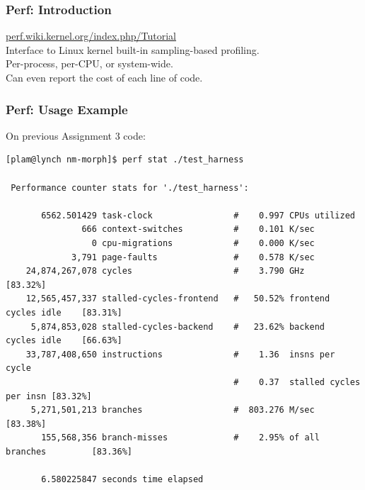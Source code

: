 \begin{frame}
  \frametitle{Perf: Introduction}


\begin{changemargin}{1cm}

    \url{perf.wiki.kernel.org/index.php/Tutorial}\\[1em]

    Interface to Linux kernel built-in sampling-based profiling.\\
    Per-process, per-CPU, or system-wide.\\
    Can even report the cost of each line of code.
    \end{changemargin}
\end{frame}

\begin{frame}[fragile]
  \frametitle{Perf: Usage Example}


\begin{changemargin}{1.5cm}
On previous Assignment 3 code:
\begin{lstlisting}[basicstyle=\tiny]
[plam@lynch nm-morph]$ perf stat ./test_harness

 Performance counter stats for './test_harness':

       6562.501429 task-clock                #    0.997 CPUs utilized          
               666 context-switches          #    0.101 K/sec                  
                 0 cpu-migrations            #    0.000 K/sec                  
             3,791 page-faults               #    0.578 K/sec                  
    24,874,267,078 cycles                    #    3.790 GHz                     [83.32%]
    12,565,457,337 stalled-cycles-frontend   #   50.52% frontend cycles idle    [83.31%]
     5,874,853,028 stalled-cycles-backend    #   23.62% backend  cycles idle    [66.63%]
    33,787,408,650 instructions              #    1.36  insns per cycle        
                                             #    0.37  stalled cycles per insn [83.32%]
     5,271,501,213 branches                  #  803.276 M/sec                   [83.38%]
       155,568,356 branch-misses             #    2.95% of all branches         [83.36%]

       6.580225847 seconds time elapsed
\end{lstlisting} %
\end{changemargin}
\end{frame}


